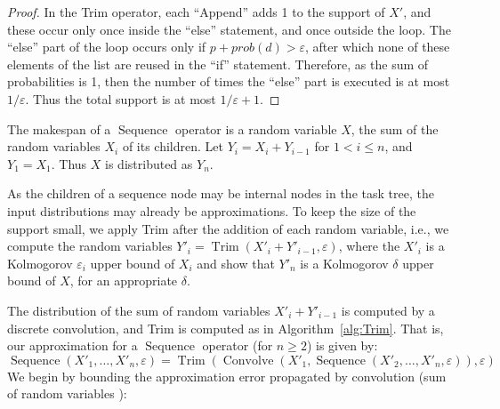 \documentclass[review]{elsarticle}
\DeclareMathOperator{\Trim}{Trim}
\DeclareMathOperator{\Sequence}{Sequence}
\DeclareMathOperator{\Convolve}{Convolve}
\begin{document}
\begin{proof}
In the Trim operator, each ``Append'' adds 1 to the support of $X'$, and these occur only once inside
the ``else'' statement, and once outside the loop.
The ``else'' part of the loop occurs only if $p+prob(d)> \varepsilon$,
after which none of these elements of the list are reused in the ``if'' statement.
Therefore, as the sum of probabilities is 1, then the number of times
the ``else'' part is executed is at most ${1}/{\varepsilon}$. Thus the total support
is at most ${1}/{\varepsilon}+1$.
\end{proof}





The makespan of a $\Sequence$ operator is a random variable $X$, the sum 
of the random variables $X_i$ of its children.
Let $Y_i = X_i + Y_{i-1}$ for $1< i \leq n$, and $Y_1=X_1$.
Thus $X$ is distributed as $Y_n$.

As the children of a sequence node may be internal nodes in the task tree,
the input distributions may already be approximations. To keep the size of
the support small, we apply Trim after the addition of each random variable, i.e., 
we compute the random variables 
$Y'_i = \Trim(X'_i + Y'_{i-1}, \varepsilon)$,
where the $X'_i$ is a Kolmogorov $\varepsilon_i $ upper bound of $X_i$
and show that $Y'_n$ is a Kolmogorov $\delta $ upper bound of $X$, for an appropriate $\delta $.

The distribution of the sum of random variables $X'_i + Y'_{i-1}$ is 
computed by a discrete convolution, and Trim is
computed as in Algorithm~\ref{alg:Trim}. That is, our approximation for a $\Sequence$ operator (for $n\geq 2$) is given by: 
\begin{equation}
\label{eq:sequence}
\Sequence(X'_1,\dots , X'_n,  \varepsilon) 
= \Trim(\Convolve(X'_1, \Sequence(X'_2, \dots , X'_n, \varepsilon)), \varepsilon)
\end{equation}
We begin by bounding the approximation error propagated by convolution (sum of random variables ):
\end{document}
